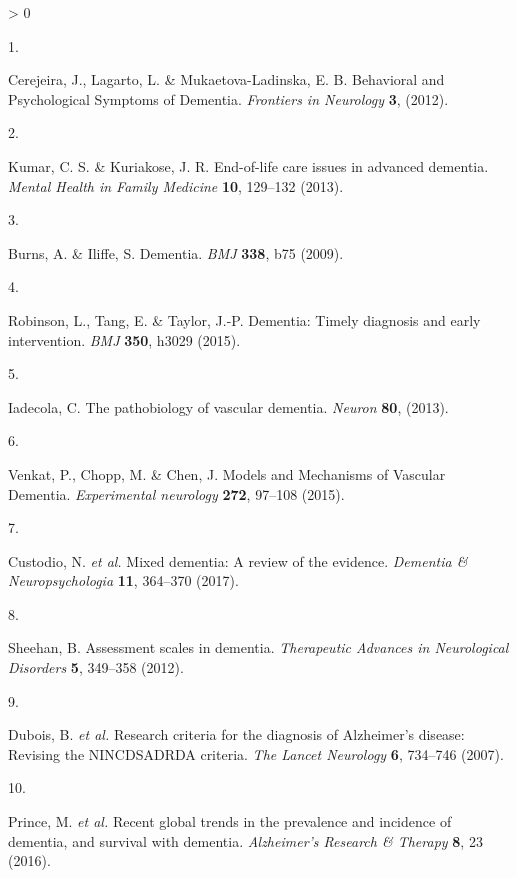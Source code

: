 \documentclass[a4paper, twoside]{templates/ociamthesis}
\newlength{\cslhangindent}
\newlength{\csllabelwidth}
\newenvironment{CSLReferences}[3] %
 {%
  \setlength{\parindent}{0pt}
  \ifodd #1 \everypar{\setlength{\hangindent}{\cslhangindent}}\ignorespaces\fi
  \ifnum #2 > 0
  \setlength{\parskip}{#2\baselineskip}
  \fi
 }%
 {}
\newcommand{\CSLLeftMargin}[1]{\parbox[t]{\maxof{\widthof{#1}}{\csllabelwidth}}{#1}}
\newcommand{\CSLRightInline}[1]{\parbox[t]{\linewidth - \csllabelwidth}{#1}}
\begin{document}
\hypertarget{refs}{}
\begin{CSLReferences}{0}{0}
\leavevmode\hypertarget{ref-cerejeira2012}{}%
\CSLLeftMargin{1. }
\CSLRightInline{Cerejeira, J., Lagarto, L. \& Mukaetova-Ladinska, E. B. Behavioral and {Psychological Symptoms} of {Dementia}. \emph{Frontiers in Neurology} \textbf{3}, (2012).}

\leavevmode\hypertarget{ref-kumar2013}{}%
\CSLLeftMargin{2. }
\CSLRightInline{Kumar, C. S. \& Kuriakose, J. R. End-of-life care issues in advanced dementia. \emph{Mental Health in Family Medicine} \textbf{10}, 129--132 (2013).}

\leavevmode\hypertarget{ref-burns2009}{}%
\CSLLeftMargin{3. }
\CSLRightInline{Burns, A. \& Iliffe, S. Dementia. \emph{BMJ} \textbf{338}, b75 (2009).}

\leavevmode\hypertarget{ref-robinson2015}{}%
\CSLLeftMargin{4. }
\CSLRightInline{Robinson, L., Tang, E. \& Taylor, J.-P. Dementia: Timely diagnosis and early intervention. \emph{BMJ} \textbf{350}, h3029 (2015).}

\leavevmode\hypertarget{ref-iadecola2013}{}%
\CSLLeftMargin{5. }
\CSLRightInline{Iadecola, C. The pathobiology of vascular dementia. \emph{Neuron} \textbf{80}, (2013).}

\leavevmode\hypertarget{ref-venkat2015}{}%
\CSLLeftMargin{6. }
\CSLRightInline{Venkat, P., Chopp, M. \& Chen, J. Models and {Mechanisms} of {Vascular Dementia}. \emph{Experimental neurology} \textbf{272}, 97--108 (2015).}

\leavevmode\hypertarget{ref-custodio2017}{}%
\CSLLeftMargin{7. }
\CSLRightInline{Custodio, N. \emph{et al.} Mixed dementia: {A} review of the evidence. \emph{Dementia \& Neuropsychologia} \textbf{11}, 364--370 (2017).}

\leavevmode\hypertarget{ref-sheehan2012}{}%
\CSLLeftMargin{8. }
\CSLRightInline{Sheehan, B. Assessment scales in dementia. \emph{Therapeutic Advances in Neurological Disorders} \textbf{5}, 349--358 (2012).}

\leavevmode\hypertarget{ref-dubois2007}{}%
\CSLLeftMargin{9. }
\CSLRightInline{Dubois, B. \emph{et al.} Research criteria for the diagnosis of {Alzheimer}'s disease: Revising the {NINCDS}{{ADRDA}} criteria. \emph{The Lancet Neurology} \textbf{6}, 734--746 (2007).}

\leavevmode\hypertarget{ref-prince2016}{}%
\CSLLeftMargin{10. }
\CSLRightInline{Prince, M. \emph{et al.} Recent global trends in the prevalence and incidence of dementia, and survival with dementia. \emph{Alzheimer's Research \& Therapy} \textbf{8}, 23 (2016).}


\end{CSLReferences}
\end{document}
